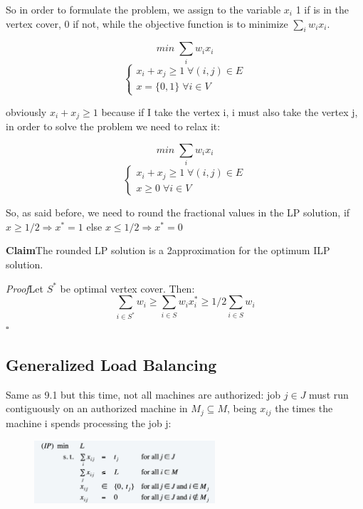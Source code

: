 \documentclass[11pt]{article}
\newenvironment{claim}[1]{\par\textbf{Claim}\space#1}{}
\newenvironment{proof}[1]{\par\textit{Proof}\space#1}{\hfill\ensuremath{\square}}
\begin{document}
So in order to formulate the problem, we assign to the variable $x_{i}$ 1 if is in the vertex cover, 0 if not, while the objective function is to minimize $\sum_{i} w_{i}x_{i}$.


 \[min \; \sum_{i} w_{i}x_{i}\]
\[\begin{cases} x_{i} + x_{j} \geq 1 \; \forall (i,j) \in E \\ x = \{0,1\} \; \forall i \in V\end{cases}\]

obviously $x_{i}+x_{j} \geq 1$ because if I take the vertex i, i must also take the vertex j, in order to solve the problem we need to relax it:

 \[min \; \sum_{i} w_{i}x_{i}\]
\[\begin{cases} x_{i} + x_{j} \geq 1 \; \forall (i,j) \in E \\ x \geq 0 \; \forall i \in V\end{cases}\]

So, as said before, we need to round the fractional values in the LP solution, if $x \geq 1/2 \Rightarrow x^{*} = 1$ else $x \leq 1/2 \Rightarrow x^{*} = 0$

\begin{claim}
The rounded LP solution is a 2approximation for the optimum ILP solution.
\end{claim}

\begin{proof}
Let $S^{*}$ be optimal vertex cover. Then:
\[\sum_{i \in S^{*}} w_{i} \geq \sum_{i \in S}w_{i}x_{i}^{*} \geq 1/2 \sum_{i \in S}w_{i}\]
\end{proof}

\subsection{Generalized Load Balancing}
Same as 9.1 but this time, not all machines are authorized: job $j \in J$ must run contiguously on an authorized machine in $M_{j} \subseteq M$, being $x_{ij}$ the times the machine i spends processing the job j:

\begin{figure}[H]
		\centering
		\includegraphics[width=0.6\textwidth ]{gILP}
\end{figure}
\end{document}
